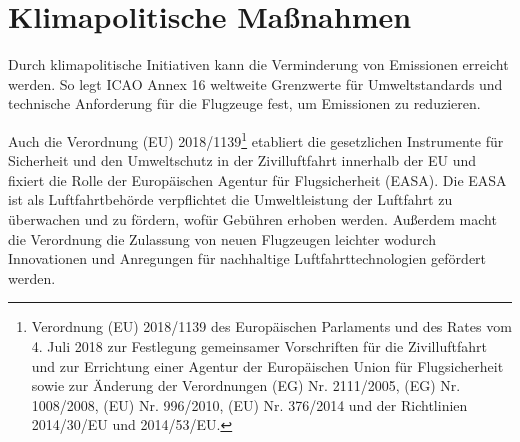 \section{Klimapolitische Maßnahmen}
\label{s:Klimapolitische Maßnahmen}


Durch klimapolitische Initiativen kann die Verminderung von Emissionen erreicht werden. 
So legt ICAO Annex 16 weltweite Grenzwerte für Umweltstandards und technische Anforderung 
für die Flugzeuge fest, um Emissionen zu reduzieren.

Auch die Verordnung (EU) 2018/1139\footnote{Verordnung (EU) 2018/1139 des Europäischen Parlaments und des Rates vom 4. Juli 2018 
zur Festlegung gemeinsamer Vorschriften für die Zivilluftfahrt und zur Errichtung einer Agentur
der Europäischen Union für Flugsicherheit sowie zur Änderung der Verordnungen (EG) Nr. 2111/2005, 
(EG) Nr. 1008/2008, (EU) Nr. 996/2010, (EU) Nr. 376/2014 und der Richtlinien 2014/30/EU und 2014/53/EU.} 
%
etabliert die gesetzlichen Instrumente 
für Sicherheit und den Umweltschutz in der Zivilluftfahrt innerhalb der EU 
und fixiert die Rolle der Europäischen Agentur für Flugsicherheit (EASA). 
Die EASA ist als Luftfahrtbehörde verpflichtet die Umweltleistung der Luftfahrt 
zu überwachen und zu fördern, wofür Gebühren erhoben werden. 
Außerdem macht die Verordnung die Zulassung von neuen Flugzeugen leichter 
wodurch Innovationen und Anregungen für nachhaltige Luftfahrttechnologien gefördert werden.

